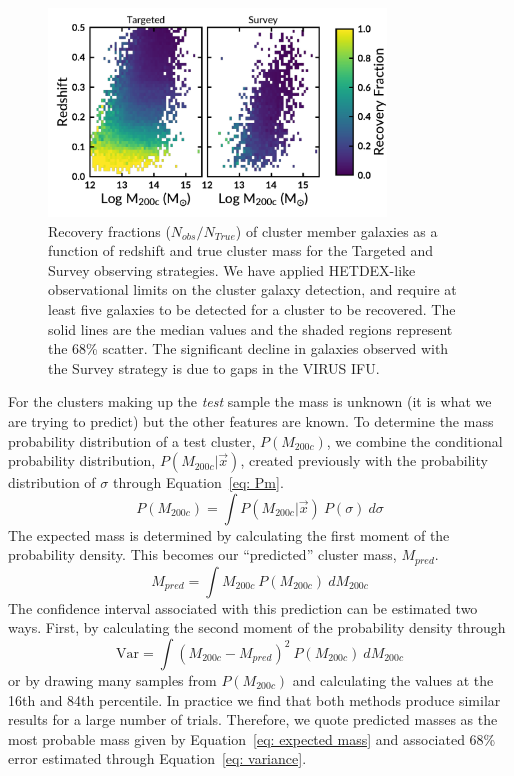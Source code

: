 \documentclass[fleqn,usenatbib]{mnras}
\begin{document}
\begin{figure}
	\includegraphics[width=0.8\textwidth]{figures/recovery.pdf} 
	\caption{Recovery fractions ($N_{obs}/N_{True}$) of cluster member galaxies as a function of redshift and true cluster mass for the Targeted and Survey observing strategies. We have applied HETDEX-like observational limits on the cluster galaxy detection, and require at least five galaxies to be detected for a cluster to be recovered. The solid lines are the median values and the shaded regions represent the 68\% scatter. The significant decline in galaxies observed with the Survey strategy is due to gaps in the VIRUS IFU.} \label{fig: recovery} 
\end{figure}

For the clusters making up the \emph{test} sample the mass is unknown (it is what we are trying to predict) but the other features are known. To determine the mass probability distribution of a test cluster, $P(M_{200c})$, we combine the conditional probability distribution, $P(M_{200c}|\vec{x})$, created previously with the probability distribution of $\sigma$ through Equation~\ref{eq: Pm}.
\begin{equation}\label{eq: Pm}
	P(M_{200c}) = \int P(M_{200c}|\vec{x})\ P(\sigma)\ d\sigma
\end{equation}
The expected mass is determined by calculating the first moment of the probability density. This becomes our ``predicted'' cluster mass, $M_{pred}$.
\begin{equation}\label{eq: expected mass}
	M_{pred}= \int M_{200c}\ P(M_{200c})\ dM_{200c}
\end{equation}
The confidence interval associated with this prediction can be estimated two ways. First, by calculating the second moment of the probability density through
\begin{equation}\label{eq: variance}
	\mathrm{Var} = \int (M_{200c} - M_{pred})^2\ P(M_{200c})\ dM_{200c}
\end{equation}
or by drawing many samples from $P(M_{200c})$ and calculating the values at the 16th and 84th percentile. In practice we find that both methods produce similar results for a large number of trials. Therefore, we quote predicted masses as the most probable mass given by Equation~\ref{eq: expected mass} and associated 68\% error estimated through Equation~\ref{eq: variance}.
\end{document}
